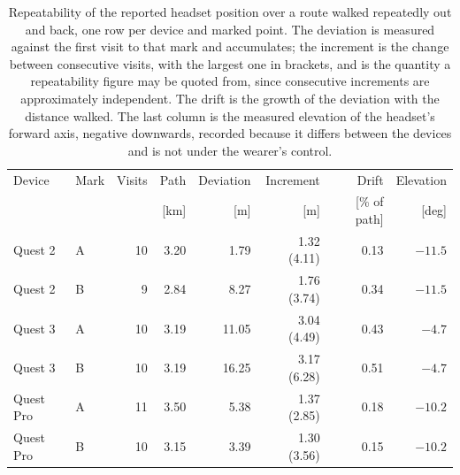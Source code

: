 \begin{table}[h!]
\caption{Repeatability of the reported headset position over a route walked repeatedly out and back, one row per device and marked point. The deviation is measured against the first visit to that mark and accumulates; the increment is the change between consecutive visits, with the largest one in brackets, and is the quantity a repeatability figure may be quoted from, since consecutive increments are approximately independent. The drift is the growth of the deviation with the distance walked. The last column is the measured elevation of the headset's forward axis, negative downwards, recorded because it differs between the devices and is not under the wearer's control.}\label{tab:repeatability}
\begin{tabular}{llrrrrrr}
\toprule
Device & Mark & Visits & Path & Deviation & Increment & Drift & Elevation \\
 &  &  & [km] & [m] & [m] & [\% of path] & [deg] \\
\midrule
Quest 2 & A & 10 & 3.20 & 1.79 & 1.32 (4.11) & 0.13 & $-11.5$ \\
Quest 2 & B & 9 & 2.84 & 8.27 & 1.76 (3.74) & 0.34 & $-11.5$ \\
\addlinespace
Quest 3 & A & 10 & 3.19 & 11.05 & 3.04 (4.49) & 0.43 & $-4.7$ \\
Quest 3 & B & 10 & 3.19 & 16.25 & 3.17 (6.28) & 0.51 & $-4.7$ \\
\addlinespace
Quest Pro & A & 11 & 3.50 & 5.38 & 1.37 (2.85) & 0.18 & $-10.2$ \\
Quest Pro & B & 10 & 3.15 & 3.39 & 1.30 (3.56) & 0.15 & $-10.2$ \\
\bottomrule
\end{tabular}
\end{table}